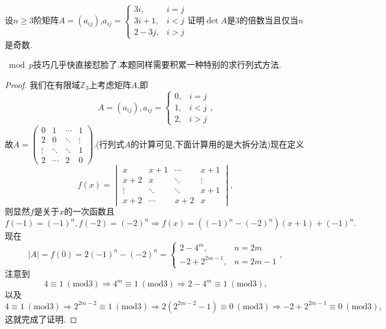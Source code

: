 \documentclass[../../main.tex]{subfiles}%
\begin{document}
\begin{example}
设\( n \geqslant 3 \)阶矩阵\( A = (a_{ij}) \),\( a_{ij} = \begin{cases}
3i, & i = j \\
3i + 1, & i < j \\
2 - 3j, & i > j
\end{cases} \)证明\( \det A \)是3的倍数当且仅当\( n \)是奇数.
\end{example}
\begin{note}
\(\bmod p\)技巧几乎快直接怼脸了.本题同样需要积累一种特别的求行列式方法.
\end{note}
\begin{proof}
我们在有限域\( \mathbb{Z}_3 \)上考虑矩阵\( A \),即
\[
A = (a_{ij}),a_{ij} = \begin{cases}
0, & i = j \\
1, & i < j \\
2, & i > j
\end{cases},
\]
故\( A = \begin{pmatrix}
0 & 1 & \cdots & 1 \\
2 & 0 & \ddots & \vdots \\
\vdots & \ddots & \ddots & 1 \\
2 & \cdots & 2 & 0
\end{pmatrix} \).(行列式$A$的计算可见,下面计算用的是大拆分法)现在定义
\[
f(x) = \begin{vmatrix}
x & x + 1 & \cdots & x + 1 \\
x + 2 & x & \ddots & \vdots \\
\vdots & \ddots & \ddots & x + 1 \\
x + 2 & \cdots & x + 2 & x
\end{vmatrix},
\]
则显然\( f \)是关于\( x \)的一次函数且
\[
f(-1) = (-1)^n,f(-2) = (-2)^n \Longrightarrow f(x) = ((-1)^n - (-2)^n)(x + 1) + (-1)^n.
\]
现在
\[
|A| = f(0) = 2(-1)^n - (-2)^n = \begin{cases}
2 - 4^m, & n = 2m \\
-2 + 2^{2m - 1}, & n = 2m - 1
\end{cases},
\]
注意到
\[
4 \equiv 1\ (\text{mod}3) \Longrightarrow 4^m \equiv 1\ (\text{mod}3) \Longrightarrow 2 - 4^m \equiv 1\ (\text{mod}3),
\]
以及
\[
4 \equiv 1\ (\text{mod}3) \Longrightarrow 2^{2m - 2} \equiv 1\ (\text{mod}3) \Longrightarrow 2(2^{2m - 2} - 1) \equiv 0\ (\text{mod}3) \Longrightarrow -2 + 2^{2m - 1} \equiv 0\ (\text{mod}3),
\]
这就完成了证明.
\end{proof}
\end{document}
